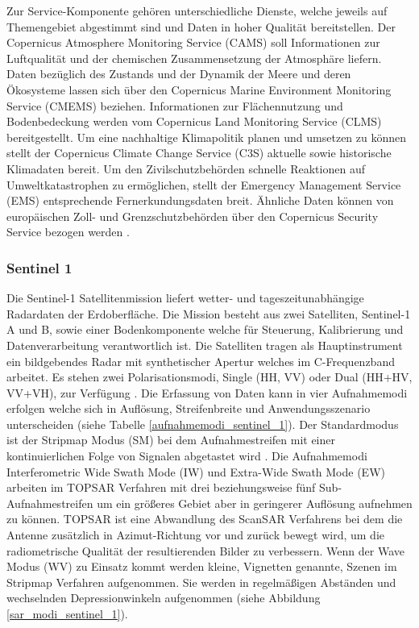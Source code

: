 Zur Service-Komponente gehören unterschiedliche Dienste, welche jeweils auf Themengebiet abgestimmt sind und Daten in hoher Qualität bereitstellen.
Der Copernicus Atmosphere Monitoring Service (CAMS) soll Informationen zur Luftqualität und der chemischen Zusammensetzung der Atmosphäre liefern. 
Daten bezüglich des Zustands und der Dynamik der Meere und deren Ökosysteme lassen sich über den Copernicus Marine Environment Monitoring Service (CMEMS) beziehen. 
Informationen zur Flächennutzung und Bodenbedeckung werden vom Copernicus Land Monitoring Service (CLMS) bereitgestellt. 
Um eine nachhaltige Klimapolitik planen und umsetzen zu können stellt der Copernicus Climate Change Service (C3S) aktuelle sowie historische Klimadaten bereit.  
Um den Zivilschutzbehörden schnelle Reaktionen auf Umweltkatastrophen zu ermöglichen, stellt der Emergency Management Service (EMS) entsprechende Fernerkundungsdaten 
breit. Ähnliche Daten können von europäischen Zoll- und Grenzschutzbehörden über den Copernicus Security Service bezogen werden
\cite{copernicus_regulation}\cite{what_is_copernicus}.

\subsubsection{Sentinel 1}
Die Sentinel-1 Satellitenmission liefert wetter- und tageszeitunabhängige Radardaten der Erdoberfläche. Die Mission besteht aus zwei Satelliten, Sentinel-1 A und B,
sowie einer Bodenkomponente welche für Steuerung, Kalibrierung und Datenverarbeitung verantwortlich ist. Die Satelliten tragen als Hauptinstrument ein 
bildgebendes Radar mit synthetischer Apertur welches im C-Frequenzband arbeitet. Es stehen zwei Polarisationsmodi, Single (HH, VV) oder Dual (HH+HV, VV+VH),
zur Verfügung \cite{sentinel_1_definition}. 
Die Erfassung von Daten kann in vier Aufnahmemodi erfolgen welche sich in Auflösung, Streifenbreite und Anwendungsszenario unterscheiden (siehe Tabelle \ref{aufnahmemodi_sentinel_1}). 
Der Standardmodus ist der Stripmap Modus (SM) bei dem Aufnahmestreifen mit einer kontinuierlichen Folge von Signalen abgetastet wird \cite{sentinel_1_definition}.
Die Aufnahmemodi Interferometric Wide Swath Mode (IW) und Extra-Wide Swath Mode (EW) arbeiten im TOPSAR Verfahren mit drei beziehungsweise
fünf Sub-Aufnahmestreifen um ein größeres Gebiet aber in geringerer Auflösung aufnehmen zu können. TOPSAR ist eine Abwandlung des ScanSAR Verfahrens bei 
dem die Antenne zusätzlich in Azimut-Richtung vor und zurück bewegt wird, um die radiometrische Qualität der resultierenden Bilder zu verbessern. 
Wenn der Wave Modus (WV) zu Einsatz kommt werden kleine, Vignetten genannte, Szenen im Stripmap Verfahren aufgenommen. Sie werden in regelmäßigen Abständen und
wechselnden Depressionwinkeln aufgenommen (siehe Abbildung \ref{sar_modi_sentinel_1})\cite{tutorial_on_sar}\cite{sentinel_1_definition}.   

